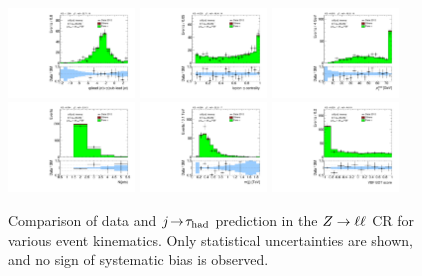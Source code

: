 \begin{figure}[!htpb]
  \includegraphics[width=0.30\textwidth]{figures/analysis/vbf-ZllCR/jets-etaprod}
  \includegraphics[width=0.30\textwidth]{figures/analysis/vbf-ZllCR/lep-eta-centrality}
  \includegraphics[width=0.30\textwidth]{figures/analysis/vbf-ZllCR/system-pt} \\
  \includegraphics[width=0.30\textwidth]{figures/analysis/vbf-ZllCR/n-jets30}
  \includegraphics[width=0.30\textwidth]{figures/analysis/vbf-ZllCR/dijet-m-veryhigh}
  \includegraphics[width=0.30\textwidth]{figures/analysis/vbf-ZllCR/BDTEve-VBF} \\
  \caption{Comparison of data and $j\!\rightarrow\!\tau_\text{had}$ prediction in the $Z \rightarrow \ell\ell$ CR for various event kinematics. Only statistical uncertainties are shown, and no sign of systematic bias is observed.}
  \label{fig:backgrounds-ZllCR-jets}
\end{figure}

